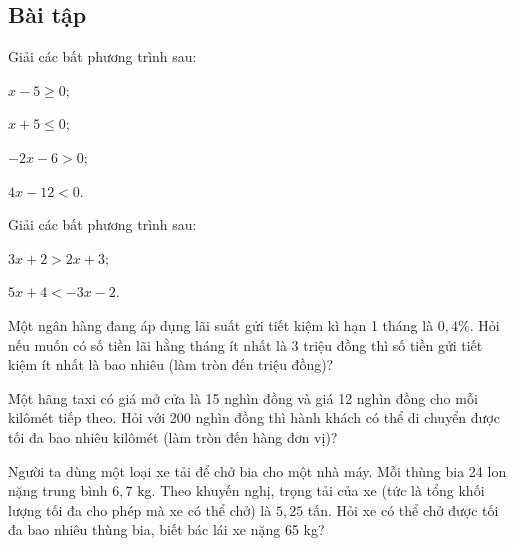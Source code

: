 \begin{exercises}
    \subsection{Bài tập}

    \begin{questions}[resume=SGK]
        \item Giải các bất phương trình sau:
        \begin{questions}
            \item $x-5\geq 0$;

            \answerline
            \item $x+5\leq 0$;

            \answerline
            \item $-2x-6>0$;

            \answerline
            \item $4x-12<0$.

            \answerline
        \end{questions}

        \item Giải các bất phương trình sau:
        \begin{questions}
            \item $3x+2>2x+3$;

            \answerline
            \item $5x+4<-3x-2$.

            \answerline
        \end{questions}

        \item Một ngân hàng đang áp dụng lãi suất gửi tiết kiệm kì hạn 1 tháng là $0{,}4\%$. Hỏi nếu muốn có số tiền lãi hằng tháng ít nhất là 3 triệu đồng thì số tiền gửi tiết kiệm ít nhất là bao nhiêu (làm tròn đến triệu đồng)?

        \answerline
        \answerline

        \item Một hãng taxi có giá mở cửa là 15 nghìn đồng và giá 12 nghìn đồng cho mỗi kilômét tiếp theo. Hỏi với 200 nghìn đồng thì hành khách có thể di chuyển được tối đa bao nhiêu kilômét (làm tròn đến hàng đơn vị)?

        \answerline
        \answerline

        \item Người ta dùng một loại xe tải để chở bia cho một nhà máy. Mỗi thùng bia 24 lon nặng trung bình $6{,}7$ kg. Theo khuyến nghị, trọng tải của xe (tức là tổng khối lượng tối đa cho phép mà xe có thể chở) là $5{,}25$ tấn. Hỏi xe có thể chở được tối đa bao nhiêu thùng bia, biết bác lái xe nặng 65 kg?

        \answerline
        \answerline
    \end{questions}
\end{exercises}

